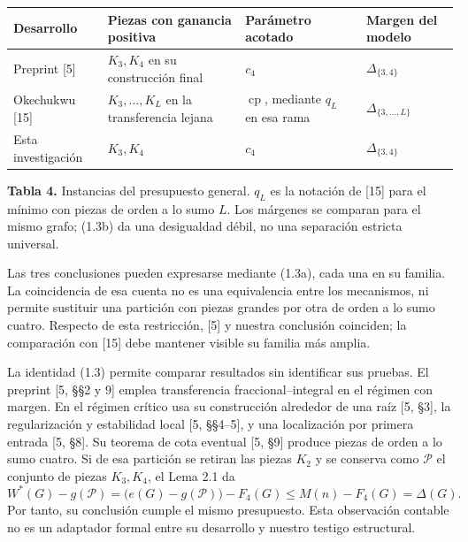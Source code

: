 \documentclass[spanish,11pt,a4paper]{article}
\newcounter{none}
\begin{document}
{\def\LTcaptype{none} %
\begin{longtable}[c]{@{}
  >{\raggedright\arraybackslash}p{}
  >{\raggedright\arraybackslash}p{}
  >{\raggedright\arraybackslash}p{}
  >{\raggedright\arraybackslash}p{}@{}}
\toprule\noalign{}
\begin{minipage}[b]{\linewidth}\raggedright
Desarrollo
\end{minipage} & \begin{minipage}[b]{\linewidth}\raggedright
Piezas con ganancia positiva
\end{minipage} & \begin{minipage}[b]{\linewidth}\raggedright
Parámetro acotado
\end{minipage} & \begin{minipage}[b]{\linewidth}\raggedright
Margen del modelo
\end{minipage} \\
\midrule\noalign{}
\endhead
\bottomrule\noalign{}
\endlastfoot
Preprint {[}5{]} & \(K_3,K_4\) en su construcción final & \(c_4\) & \(\Delta_{\{3,4\}}\) \\
Okechukwu {[}15{]} & \(K_3,\ldots,K_L\) en la transferencia lejana & \(\operatorname{cp}\), mediante \(q_L\) en esa rama & \(\Delta_{\{3,\ldots,L\}}\) \\
Esta investigación & \(K_3,K_4\) & \(c_4\) & \(\Delta_{\{3,4\}}\) \\
\end{longtable}
}

\textbf{Tabla 4.} Instancias del presupuesto general. \(q_L\) es la notación de {[}15{]} para el mínimo con piezas de orden a lo sumo \(L\). Los márgenes se comparan para el mismo grafo; (1.3b) da una desigualdad débil, no una separación estricta universal.

Las tres conclusiones pueden expresarse mediante (1.3a), cada una en su familia. La coincidencia de esa cuenta no es una equivalencia entre los mecanismos, ni permite sustituir una partición con piezas grandes por otra de orden a lo sumo cuatro. Respecto de esta restricción, {[}5{]} y nuestra conclusión coinciden; la comparación con {[}15{]} debe mantener visible su familia más amplia.

La identidad (1.3) permite comparar resultados sin identificar sus pruebas. El preprint {[}5, §§2 y 9{]} emplea transferencia fraccional--integral en el régimen con margen. En el régimen crítico usa su construcción alrededor de una raíz {[}5, §3{]}, la regularización y estabilidad local {[}5, §§4--5{]}, y una localización por primera entrada {[}5, §8{]}. Su teorema de cota eventual {[}5, §9{]} produce piezas de orden a lo sumo cuatro. Si de esa partición se retiran las piezas \(K_2\) y se conserva como \(\mathcal P\) el conjunto de piezas \(K_3,K_4\), el Lema 2.1 da \[
W^*(G)-g(\mathcal P)
=\bigl(e(G)-g(\mathcal P)\bigr)-F_4(G)
\le M(n)-F_4(G)=\Delta(G).
\tag{8.1}
\] Por tanto, su conclusión cumple el mismo presupuesto. Esta observación contable no es un adaptador formal entre su desarrollo y nuestro testigo estructural.
\end{document}
